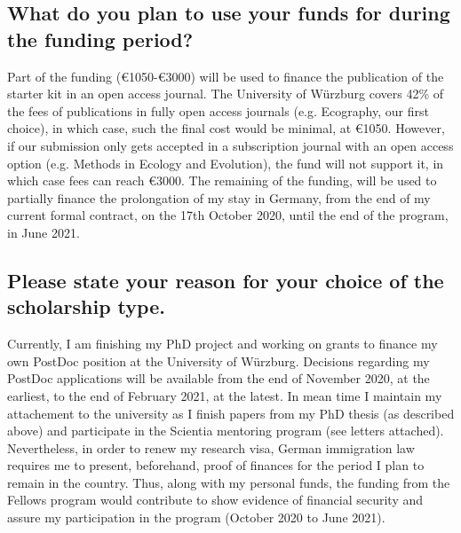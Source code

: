 \documentclass[11pt,]{article}
\begin{document}
\subsection*{What do you plan to use your funds for during the funding period?}
Part of the funding (\euro{1050}-\euro{3000}) will be used to finance the publication of the starter kit in an open access journal.
The University of Würzburg covers 42\% of the fees of publications in fully open access journals (e.g. Ecography, our first choice), in which case, such the final cost would be minimal, at \euro{1050}.
However, if our submission only gets accepted in a subscription journal with an open access option (e.g. Methods in Ecology and Evolution), the fund will not support it, in which case fees can reach \euro{3000}.
The remaining of the funding, will be used to partially finance the prolongation of my stay in Germany, from the end of my current formal contract, on the 17th October 2020, until the end of the program, in June 2021. 

\subsection*{Please state your reason for your choice of the scholarship type.}
Currently, I am finishing my PhD project and working on grants to finance my own PostDoc position at the University of Würzburg.
Decisions regarding my PostDoc applications will be available from the end of November 2020, at the earliest, to the end of February 2021, at the latest.
In mean time I maintain my attachement to the university as I finish papers from my PhD thesis (as described above) and participate in the Scientia mentoring program (see letters attached).
Nevertheless, in order to renew my research visa, German immigration law requires me to present, beforehand, proof of finances for the period I plan to remain in the country.
Thus, along with my personal funds, the funding from the Fellows program would contribute to show evidence of financial security and assure my participation in the program (October 2020 to June 2021). 

\newpage\clearpage


\newpage
\end{document}
